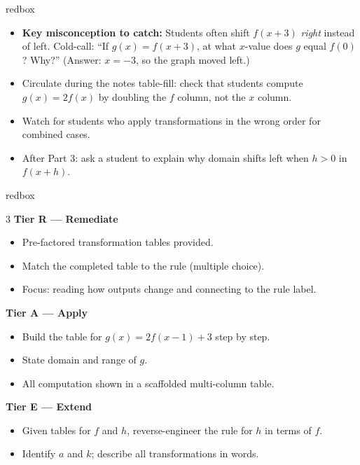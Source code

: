 \documentclass[10pt]{article}
\begin{document}
\begin{skillbox}{redbox}
\begin{itemize}[leftmargin=1.2em,itemsep=2pt,topsep=0pt]
  \item \textbf{Key misconception to catch:} Students often shift $f(x+3)$ \textit{right} instead of left. Cold-call: ``If $g(x)=f(x+3)$, at what $x$-value does $g$ equal $f(0)$? Why?'' (Answer: $x=-3$, so the graph moved left.)
  \item Circulate during the notes table-fill: check that students compute $g(x)=2f(x)$ by doubling the $f$ column, not the $x$ column.
  \item Watch for students who apply transformations in the wrong order for combined cases.
  \item After Part 3: ask a student to explain why domain shifts left when $h>0$ in $f(x+h)$.
\end{itemize}
\end{skillbox}

\begin{skillbox}{redbox}
\begin{multicols}{3}
\textbf{Tier R --- Remediate}
\begin{itemize}[leftmargin=1.2em,itemsep=2pt,topsep=2pt]
  \item Pre-factored transformation tables provided.
  \item Match the completed table to the rule (multiple choice).
  \item Focus: reading how outputs change and connecting to the rule label.
\end{itemize}

\columnbreak

\textbf{Tier A --- Apply}
\begin{itemize}[leftmargin=1.2em,itemsep=2pt,topsep=2pt]
  \item Build the table for $g(x)=2f(x-1)+3$ step by step.
  \item State domain and range of $g$.
  \item All computation shown in a scaffolded multi-column table.
\end{itemize}

\columnbreak

\textbf{Tier E --- Extend}
\begin{itemize}[leftmargin=1.2em,itemsep=2pt,topsep=2pt]
  \item Given tables for $f$ and $h$, reverse-engineer the rule for $h$ in terms of $f$.
  \item Identify $a$ and $k$; describe all transformations in words.
\end{itemize}
\end{multicols}
\end{skillbox}
\end{document}
